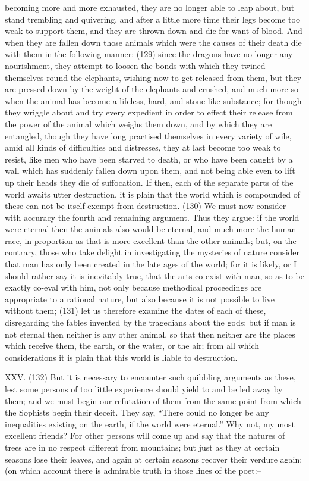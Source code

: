 becoming more and more exhausted, they are no longer able to leap about, but stand trembling and
quivering, and after a little more time their legs become too weak to support them, and they are
thrown down and die for want of blood. And when they are fallen down those animals which were
the causes of their death die with them in the following manner: (129) since the dragons have no
longer any nourishment, they attempt to loosen the bonds with which they twined themselves round
the elephants, wishing now to get released from them, but they are pressed down by the weight of
the elephants and crushed, and much more so when the animal has become a lifeless, hard, and
stone-like substance; for though they wriggle about and try every expedient in order to effect their
release from the power of the animal which weighs them down, and by which they are entangled,
though they have long practised themselves in every variety of wile, amid all kinds of difficulties and
distresses, they at last become too weak to resist, like men who have been starved to death, or
who have been caught by a wall which has suddenly fallen down upon them, and not being able
even to lift up their heads they die of suffocation. If then, each of the separate parts of the world
awaits utter destruction, it is plain that the world which is compounded of these can not be itself
exempt from destruction. (130) We must now consider with accuracy the fourth and remaining
argument. Thus they argue: if the world were eternal then the animals also would be eternal, and
much more the human race, in proportion as that is more excellent than the other animals; but, on
the contrary, those who take delight in investigating the mysteries of nature consider that man has
only been created in the late ages of the world; for it is likely, or I should rather say it is inevitably
true, that the arts co-exist with man, so as to be exactly co-eval with him, not only because
methodical proceedings are appropriate to a rational nature, but also because it is not possible to
live without them; (131) let us therefore examine the dates of each of these, disregarding the
fables invented by the tragedians about the gods; but if man is not eternal then neither is any other
animal, so that then neither are the places which receive them, the earth, or the water, or the air;
from all which considerations it is plain that this world is liable to destruction.

XXV. (132) But it is necessary to encounter such quibbling arguments as these, lest some persons
of too little experience should yield to and be led away by them; and we must begin our refutation of
them from the same point from which the Sophists begin their deceit. They say, ``There could no
longer be any inequalities existing on the earth, if the world were eternal.'' Why not, my most
excellent friends? For other persons will come up and say that the natures of trees are in no
respect different from mountains; but just as they at certain seasons lose their leaves, and again
at certain seasons recover their verdure again; (on which account there is admirable truth in those
lines of the poet:--

